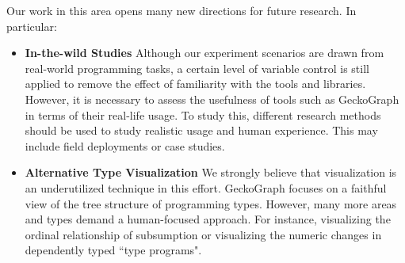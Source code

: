 Our work in this area opens many new directions for future research.  In particular:
\begin{itemize}
  \item{\textbf{In-the-wild Studies}
  Although our experiment scenarios are drawn from real-world programming tasks, a certain level of variable control is still applied to remove the effect of familiarity with the tools and libraries. However, it is necessary to assess the usefulness of tools such as GeckoGraph in terms of their real-life usage. To study this, different research methods should be used to study realistic usage and human experience. This may include field deployments or case studies. }

  \item{\textbf{Alternative Type Visualization}
  We strongly believe that visualization is an underutilized technique in this effort. GeckoGraph focuses on a faithful view of the tree structure of programming types. However, many more areas and types demand a human-focused approach. For instance, visualizing the ordinal relationship of subsumption or visualizing the numeric changes in dependently typed ``type programs".}
\end{itemize}